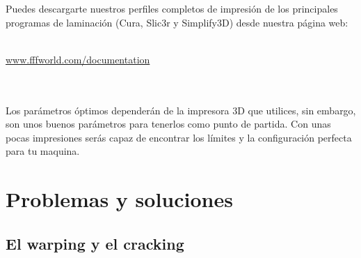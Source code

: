\documentclass[11pt,a4paper]{article}
\begin{document}
Puedes descargarte nuestros perfiles completos de impresión de los principales programas de laminación (Cura, Slic3r y Simplify3D) desde nuestra página web:
\\\\
\centerline{ {\huge \url{www.fffworld.com/documentation} } }
\\\\
Los parámetros óptimos dependerán de la impresora 3D que utilices, sin embargo, son unos buenos parámetros para tenerlos como punto de partida. Con unas pocas impresiones serás capaz de encontrar los límites y la configuración perfecta para tu maquina.
\section{Problemas y soluciones}
	\subsection{El warping y el cracking}
\end{document}
